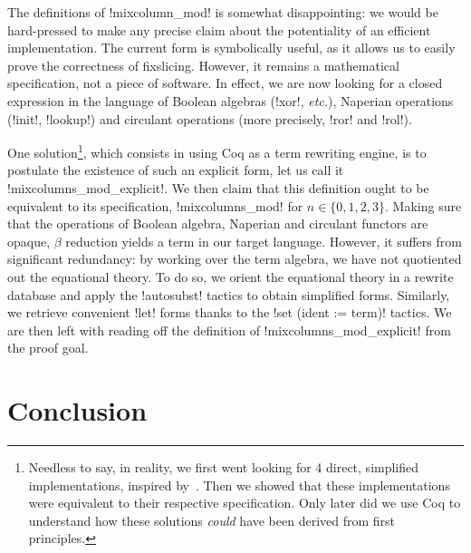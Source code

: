 \documentclass[draft,english]{jflart}
\newcommand{\etc}{\textit{etc.}}
\begin{document}


The definitions of \coqe!mixcolumn_mod! is somewhat disappointing: we
would be hard-pressed to make any precise claim about the potentiality
of an efficient implementation. The current form is symbolically
useful, as it allows us to easily prove the correctness of fixslicing.
However, it remains a mathematical specification, not a piece of
software. In effect, we are now looking for a closed expression in the
language of Boolean algebras (\coqe!xor!, \etc{}), Naperian operations
(\coqe!init!, \coqe!lookup!) and circulant operations (more precisely,
\coqe!ror! and \coqe!rol!).

One solution\footnote{Needless to say, in reality, we first went
looking for 4 direct, simplified implementations, inspired
by~\citet{adominicai:fixslicing-gift}. Then we showed that these
implementations were equivalent to their respective
specification. Only later did we use Coq to understand how these
solutions \emph{could} have been derived from first principles.},
which consists in using Coq as a term rewriting engine, is to
postulate the existence of such an explicit form, let us call it
%
\coqe!mixcolumns_mod_explicit!.
%
We then claim that this definition ought to be equivalent to its
specification, \coqe!mixcolumns_mod! for $n \in \{0, 1, 2, 3\}$.
Making sure that the operations of Boolean algebra, Naperian and
circulant functors are opaque, $\beta$ reduction yields a term in our
target language. However, it suffers from significant redundancy: by
working over the term algebra, we have not quotiented out the
equational theory. To do so, we orient the equational theory in a
rewrite database and apply the \coqe!autosubst! tactics to obtain
simplified forms. Similarly, we retrieve convenient \coqe!let! forms
thanks to the \coqe!set (ident := term)! tactics. We are then left
with reading off the definition of \coqe!mixcolumns_mod_explicit! from
the proof goal.



\section{Conclusion}
\end{document}
